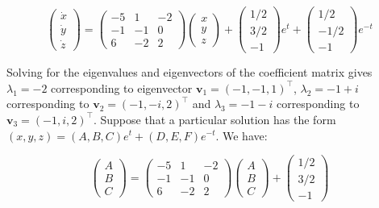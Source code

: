 \documentclass[12pt]{article}
\begin{document}
\begin{equation}
    \begin{pmatrix}
        \dot{x} \\
        \dot{y} \\
        \dot{z}
    \end{pmatrix}
    =
    \begin{pmatrix}
        -5 & 1  & -2 \\
        -1 & -1 & 0  \\
        6  & -2 & 2
    \end{pmatrix}
    \begin{pmatrix}
        x \\
        y \\
        z
    \end{pmatrix}
    +
    \begin{pmatrix}
        1/2 \\
        3/2 \\
        -1
    \end{pmatrix}
    e^{t}
    +
    \begin{pmatrix}
        1/2  \\
        -1/2 \\
        -1
    \end{pmatrix}
    e^{-t}
\end{equation}

Solving for the eigenvalues and eigenvectors of the coefficient matrix gives $\lambda_{1} = -2$ corresponding to eigenvector $\mathbf{v}_{1} = (-1, -1, 1)^{\intercal}$, $\lambda_{2} = -1 + i$ corresponding to $\mathbf{v}_{2} = (-1, -i, 2)^{\intercal}$ and $\lambda_{3} = -1 - i$ corresponding to $\mathbf{v}_{3} = (-1, i, 2)^{\intercal}$. Suppose that a particular solution has the form $(x, y, z) = (A, B, C)e^{t} + (D, E, F)e^{-t}$. We have:

\begin{equation}
    \begin{pmatrix}
        A \\
        B \\
        C
    \end{pmatrix}
    =
    \begin{pmatrix}
        -5 & 1  & -2 \\
        -1 & -1 & 0  \\
        6  & -2 & 2
    \end{pmatrix}
    \begin{pmatrix}
        A \\
        B \\
        C
    \end{pmatrix}
    +
    \begin{pmatrix}
        1/2 \\
        3/2 \\
        -1
    \end{pmatrix}
\end{equation}
\end{document}
